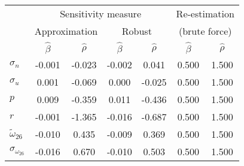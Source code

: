 \begin{tabular}{l*{6}{c}} \toprule 
& \multicolumn{4}{c}{Sensitivity measure} & \multicolumn{2}{c}{Re-estimation} \\ \cmidrule(lr){2-5} \cmidrule(lr){6-7}  
& \multicolumn{2}{c}{Approximation} & \multicolumn{2}{c}{Robust} & \multicolumn{2}{c}{(brute force)} \\ \cmidrule(lr){2-3} \cmidrule(lr){4-5} \cmidrule(lr){6-7}  
& $\hat{\beta}$ & $\hat{\rho}$ & $\hat{\beta}$ & $\hat{\rho}$ & $\hat{\beta}$ & $\hat{\rho}$ \\ \cmidrule(lr){2-7} 
  $\sigma_{n}$ & -0.001 & -0.023 & -0.002 & 0.041 & 0.500 & 1.500 \\ 
  $\sigma_{u}$ & 0.001 & -0.069 & 0.000 & -0.025 & 0.500 & 1.500 \\ 
  $p$ & 0.009 & -0.359 & 0.011 & -0.436 & 0.500 & 1.500 \\ 
  $r$ & -0.001 & -1.365 & -0.016 & -0.687 & 0.500 & 1.500 \\ 
  $\tilde{\omega}_{26}$ & -0.010 & 0.435 & -0.009 & 0.369 & 0.500 & 1.500 \\ 
  $\sigma_{\omega_{26}}$ & -0.016 & 0.670 & -0.010 & 0.503 & 0.500 & 1.500 \\ 
 \bottomrule 
 \end{tabular}